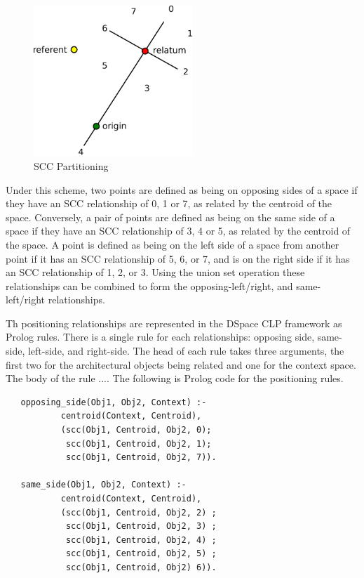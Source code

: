 \documentclass[12pt]{ucthesis}
\begin{document}
\begin{figure}[H]
\centering
\includegraphics[width=60mm]{scc}
\caption{SCC Partitioning}
\label{scc}
\end{figure}

Under this scheme, two points are defined as being on opposing sides of a space if they have an SCC relationship of 0, 1 or 7, as related by the centroid of the space. Conversely, a pair of points are defined as being on the same side of a space if they have an SCC relationship of 3, 4 or 5, as related by the centroid of the  space. A point is defined as being on the left side of a space from another point if it has an SCC relationship of 5, 6, or 7, and is on the right side if it has an SCC relationship of 1, 2, or 3. Using the union set operation these relationships can be combined to form the opposing-left/right, and same-left/right relationships.

Th positioning relationships are represented in the DSpace CLP framework as Prolog rules. There is a single rule for each relationships: opposing side, same-side, left-side, and right-side. The head of each rule takes three arguments, the first two for the architectural objects being related and one for the context space. The body of the rule ....  The following is Prolog code for the positioning rules.
\begin{verbatim}
   opposing_side(Obj1, Obj2, Context) :- 
           centroid(Context, Centroid),
           (scc(Obj1, Centroid, Obj2, 0);
            scc(Obj1, Centroid, Obj2, 1);
            scc(Obj1, Centroid, Obj2, 7)).
                                          
   same_side(Obj1, Obj2, Context) :- 
           centroid(Context, Centroid),
           (scc(Obj1, Centroid, Obj2, 2) ;
            scc(Obj1, Centroid, Obj2, 3) ;
            scc(Obj1, Centroid, Obj2, 4) ;
            scc(Obj1, Centroid, Obj2, 5) ;
            scc(Obj1, Centroid, Obj2) 6)).   

\end{verbatim}
\end{document}
